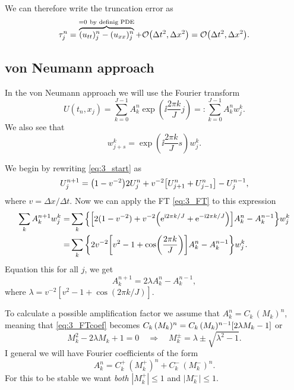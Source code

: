 \documentclass[11pt,letter, swedish, english
]{article}
\newcommand{\Dx}{\ensuremath{\Delta{x}}}
\newcommand{\Dt}{\ensuremath{\Delta{t}}}
\begin{document}
We can therefore write the truncation error as
\begin{equation}
\tau_j^n=
\overbrace{(u_{tt})_j^n-(u_{xx})_j^n}^{=0\ \text{by definig PDE}}
+\order{\Dt^2, \Dx^2}=\order{\Dt^2, \Dx^2}.
\end{equation}

\subsection{von Neumann approach}
In the von Neumann approach we will use the Fourier transform
\begin{equation}\label{eq:3_FT}
U(t_n,x_j)=\sum_{k=0}^{J-1} A_k^n\exp(\ii\frac{2\pi k}{J}j)
=:\sum_{k=0}^{J-1} A_k^nw_j^k.
\end{equation}
We also see that
\begin{equation}
w_{j+s}^k=\exp(\ii\frac{2\pi k}{J}s)w_j^k.
\end{equation}

We begin by rewriting \eqref{eq:3_start} as
\begin{equation}
U_j^{n+1}=\qty(1-v^{-2})2U_j^n+v^{-2}\qty[U_{j+1}^n+U_{j-1}^n]
-U_j^{n-1},
\end{equation}
where $v=\Dx/\Dt$. Now we can apply the FT \eqref{eq:3_FT} to this
expression
\begin{equation}
\begin{aligned}
\sum_kA_k^{n+1}w_j^k=&\sum_k \qty{\qty[
2(1-v^{-2})+v^{-2}\qty(\mathrm{e}^{\mathrm{i}2\pi k/J}+\mathrm{e}^{-\mathrm{i}2\pi k/J})]A_k^n
-A_k^{n-1} }w_j^k\\
=&\sum_k \qty{2v^{-2}\qty[
v^{2}-1+\cos(\frac{2\pi k}{J})]A_k^n
-A_k^{n-1} }w_j^k.
\end{aligned}
\end{equation}
Equation this for all $j$, we get
\begin{equation}\label{eq:3_FTcoef}
A_k^{n+1}=2\lambda A_k^n-A_k^{n-1},
\end{equation}
where $\lambda=v^{-2}[v^{2}-1+\cos(2\pi k/J)]$.

To calculate a possible amplification factor we assume that
$A_k^n=C_k\,(M_k)^n$, meaning that \eqref{eq:3_FTcoef} becomes
$%
C_k\,(M_k)^n=C_k\,(M_k)^{n-1}\qty[2\lambda M_k-1]
$%
or
\begin{equation}
M_k^2-2\lambda M_k+1=0
\quad\Longrightarrow\quad
M_k^\pm=\lambda\pm\sqrt{\lambda^2-1}.
\end{equation}
I  general we will have Fourier coefficients of the form
\begin{equation}
A_k^n=C_k^+\,(M_k^+)^n+C_k^-\,(M_k^-)^n.
\end{equation}
For this to be stable we want \emph{both} $|M_k^+|\le1$ and
$|M_k^-|\le1$. 
\end{document}

